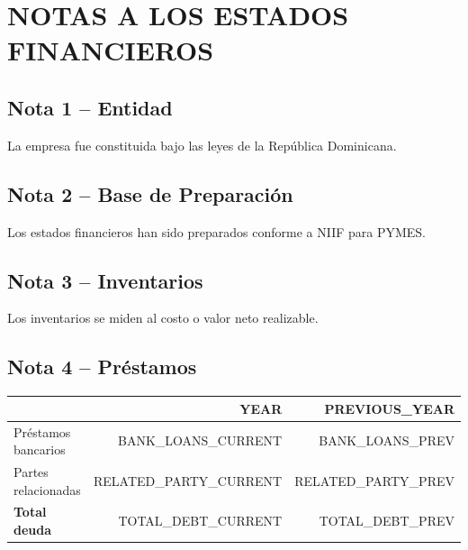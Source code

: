 \documentclass[10pt,letterpaper]{article}
\begin{document}
\newpage


\section{NOTAS A LOS ESTADOS FINANCIEROS}

\subsection*{Nota 1 – Entidad}

La empresa fue constituida bajo las leyes de la República Dominicana.

\subsection*{Nota 2 – Base de Preparación}

Los estados financieros han sido preparados conforme a NIIF para PYMES.

\subsection*{Nota 3 – Inventarios}

Los inventarios se miden al costo o valor neto realizable.

\subsection*{Nota 4 – Préstamos}

\begin{tabular}{lrr}

\toprule
 & {{YEAR}} & {{PREVIOUS_YEAR}} \\
\midrule

Préstamos bancarios & {{BANK_LOANS_CURRENT}} & {{BANK_LOANS_PREV}} \\
Partes relacionadas & {{RELATED_PARTY_CURRENT}} & {{RELATED_PARTY_PREV}} \\

\textbf{Total deuda} & {{TOTAL_DEBT_CURRENT}} & {{TOTAL_DEBT_PREV}} \\

\bottomrule

\end{tabular}
\end{document}
